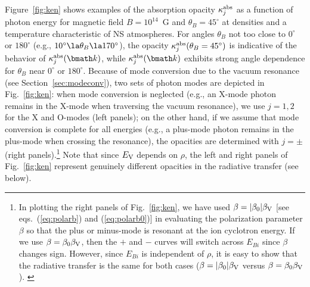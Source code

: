 \documentclass{mn2e}
\newcommand{\veck}{{\bmath k}}
\newcommand{\kabsj}{\kappa^{\rm abs}_j}
\newcommand{\Ebi}{E_{Bi}}
\newcommand{\thetab}{\theta_B}
\newcommand{\polarb}{\beta}
\newcommand{\Evp}{E_{\rm V}}
\newcommand{\polarbvp}{\beta_{\rm V}}
\begin{document}
{Figure~\ref{fig:ken} shows examples of the absorption opacity
$\kabsj$ as a function of photon energy for magnetic field
$B=10^{14}$~G and $\thetab=45^\circ$
at densities and a temperature characteristic of NS atmospheres.
For angles $\thetab$ not too close to $0^\circ$ or $180^\circ$
(e.g., $10^\circ\la\thetab\la 170^\circ$), the opacity
$\kabsj(\thetab=45^\circ)$ is indicative of the behavior of
$\kabsj(\veck)$, while $\kabsj(\veck)$ exhibits strong angle dependence
for $\thetab$ near $0^\circ$ or $180^\circ$.
Because of mode conversion due to the vacuum resonance
(see Section~\ref{sec:modeconv}), two sets of photon modes are
depicted in Fig.~\ref{fig:ken}: when mode conversion is neglected
(e.g., an X-mode photon remains in the X-mode when traversing
the vacuum resonance), we use $j=1,2$ for the X and O-modes (left
panels); on the other hand, if we assume that mode conversion
is complete for all energies (e.g., a plus-mode photon remains
in the plus-mode when crossing the resonance), the opacities
are determined with $j=\pm$ (right panels).\footnote{
In plotting the right panels of Fig.~\ref{fig:ken}, we have used
$\polarb=|\polarb_0|\polarbvp$ [see eqs.~(\ref{eq:polarb}) and
(\ref{eq:polarb0})] in evaluating the polarization parameter
$\polarb$ so that the plus or minus-mode is resonant at the
ion cyclotron energy.  If we use $\polarb=\polarb_0\polarbvp$,
then the $+$ and $-$ curves will switch across $\Ebi$ since $\polarb$
changes sign.  However, since $\Ebi$ is independent of $\rho$,
it is easy to show that the radiative transfer is the same for
both cases ($\polarb=|\polarb_0|\polarbvp$ versus
$\polarb=\polarb_0\polarbvp$). \label{foot:ken}
}
Note that since $\Evp$ depends on $\rho$, the left and right
panels of Fig.~\ref{fig:ken} represent genuinely different
opacities in the radiative transfer (see below).

}
\end{document}
